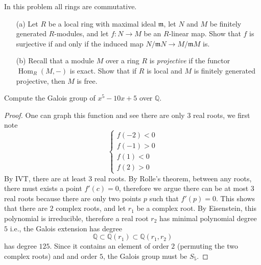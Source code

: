 \documentclass[openany]{book}
\newcommand{\Q}{\mathbb{Q}}
\begin{document}
\begin{prob}
    In this problem all rings are commutative.
    \begin{itemize}
        \item[(a)] Let \(R\) be a local ring with maximal ideal \(\mathfrak{m}\), let \(N\) and \(M\) be finitely generated \(R\)-modules, and let \(f\colon N\to M\) be an \(R\)-linear map. Show that \(f\) is surjective if and only if the induced map \(N/\mathfrak{m}N\to M/\mathfrak{m}M\) is.
        \item[(b)] Recall that a module \(M\) over a ring \(R\) is \textit{projective} if the functor \(\operatorname{Hom}_{R}(M,-)\) is exact. Show that if \(R\) is local and \(M\) is finitely generated projective, then \(M\) is free.
    \end{itemize}
\end{prob}


\begin{prob}
    Compute the Galois group of \(x^{5}-10x+5\) over \(\mathbb{Q}\).
\end{prob}
\begin{proof}
    One can graph this function and see there are only $3$ real roots, we first note 
    \begin{equation*}
        \begin{cases}
            f(-2)<0\\
            f(-1)>0\\
            f(1)<0\\
            f(2)>0
        \end{cases}
    \end{equation*}
    By IVT, there are at least $3$ real roots. By Rolle's theorem, between any roots, there must exists a point $f'(c)=0$, therefore we argue there can be at most 3 real roots because there are only two points $p$ such that $f'(p)=0$. This shows that there are $2$ complex roots, and let $r_1$ be a complex root. By Eisenstein, this polynomial is irreducible, therefore a real root $r_2$ has minimal polynomial degree $5$ i.e., the Galois extension has degree 
    \begin{equation*}
        \Q\subset\Q(r_1)\subset\Q(r_1,r_2)
    \end{equation*}
    has degree $125$. Since it contains an element of order $2$ (permuting the two complex roots) and and order $5$, the Galois group must be $S_5$.
\end{proof}
\end{document}

